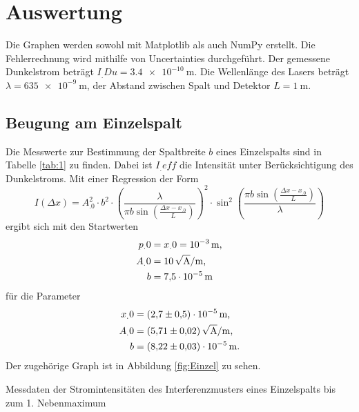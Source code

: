 \section{Auswertung}
\label{sec:Auswertung}


Die Graphen werden sowohl mit Matplotlib \cite{matplotlib} als auch NumPy \cite{numpy} erstellt. Die Fehlerrechnung wird mithilfe von Uncertainties \cite{uncertainties} 
durchgeführt.
\newline\newline
Der gemessene Dunkelstrom beträgt $I_.{Du}=\SI{3,4e-10}{\metre}$.
Die Wellenlänge des Lasers beträgt $\lambda = \SI{635e-9}{\metre}$, der Abstand zwischen Spalt und Detektor $L=\SI{1}{\metre}$.
\subsection{Beugung am Einzelspalt}

Die Messwerte zur Bestimmung der Spaltbreite $b$ eines Einzelspalts sind in Tabelle \ref{tab:1} zu finden. Dabei ist $I_.{eff}$ die Intensität unter Berücksichtigung des Dunkelstroms.
Mit einer Regression der Form 
\[
I(\Delta x)=A^2_.0\cdot b^2\cdot\left(
\frac{\lambda}{\pi b \sin{\left(\frac{\Delta x-x_.0}{L}\right)}}\right)^2\cdot\sin^2{\left(\frac{\pi b\sin{\left(\frac{\Delta x-x_.0}{L}\right)}}{\lambda}\right)}
\]
ergibt sich mit den Startwerten
\begin{align*}
p_.0 	&= x_.0=\SI{e-3}{\metre}\text{,}\\
A_.0	&=\SI{10}{\sqrt{\ampere}\per\metre}\text{,}\\
b		&=\SI{7,5e-5}{\metre}\\
\end{align*}
für die Parameter
\begin{align*}
x_.0&= \SI{2,7(5)e-5}{\metre}\text{,} \\
A_.0&= \SI{5,71(2)}{\sqrt{\ampere}\per\metre}\text{,} \\
b   &= \SI{8,22(3)e-5}{\metre}\text{.} \\
\end{align*}
Der zugehörige Graph ist in Abbildung \ref{fig:Einzel} zu sehen.

\begin{table}
\caption{Messdaten der Stromintensitäten des Interferenzmusters eines Einzelspalts bis zum 1. Nebenmaximum}


\label{tab:1}
\end{table}

